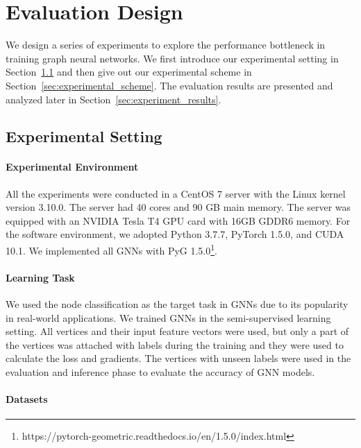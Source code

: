 \section{Evaluation Design}
\label{sec:experimental_design}

We design a series of experiments to explore the performance bottleneck in training graph neural networks.
We first introduce our experimental setting in Section~\ref{sec:experimental_env} and then give out our experimental scheme in Section~\ref{sec:experimental_scheme}.
The evaluation results are presented and analyzed later in Section~\ref{sec:experiment_results}.

\subsection{Experimental Setting}
\label{sec:experimental_env}

\paragraph{Experimental Environment}
All the experiments were conducted in a CentOS 7 server with the Linux kernel version 3.10.0.
The server had 40 cores and 90 GB main memory.
The server was equipped with an NVIDIA Tesla T4 GPU card with 16GB GDDR6 memory.
For the software environment, we adopted Python 3.7.7, PyTorch 1.5.0, and CUDA 10.1.
We implemented all GNNs with PyG 1.5.0\footnote{https://pytorch-geometric.readthedocs.io/en/1.5.0/index.html}.

\paragraph{Learning Task}
We used the node classification as the target task in GNNs due to its popularity in real-world applications.
We trained GNNs in the semi-supervised learning setting.
All vertices and their input feature vectors were used, but only a part of the vertices was attached with labels during the training and they were used to calculate the loss and gradients.
The vertices with unseen labels were used in the evaluation and inference phase to evaluate the accuracy of GNN models.

\paragraph{Datasets}

